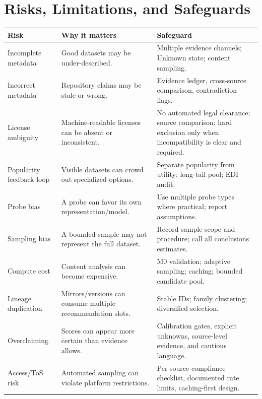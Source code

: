 \documentclass[11pt]{article}
\begin{document}
\section{Risks, Limitations, and Safeguards}
\begin{longtable}{@{}L{2.6cm}L{4.8cm}L{6.2cm}@{}}
\toprule
\textbf{Risk} & \textbf{Why it matters} & \textbf{Safeguard} \\
\midrule
\endhead
Incomplete metadata & Good datasets may be under-described. & Multiple evidence channels; Unknown state;
  content sampling. \\
Incorrect metadata & Repository claims may be stale or wrong. & Evidence ledger, cross-source comparison,
  contradiction flags. \\
License ambiguity & Machine-readable licenses can be absent or inconsistent. & No automated legal
  clearance; source comparison; hard exclusion only when incompatibility is clear and required. \\
Popularity feedback loop & Visible datasets can crowd out specialized options. & Separate popularity from
  utility; long-tail pool; EDI audit. \\
Probe bias & A probe can favor its own representation/model. & Use multiple probe types where practical;
  report assumptions. \\
Sampling bias & A bounded sample may not represent the full dataset. & Record sample scope and procedure;
  call all conclusions estimates. \\
Compute cost & Content analysis can become expensive. & M0 validation; adaptive sampling; caching; bounded
  candidate pool. \\
Lineage duplication & Mirrors/versions can consume multiple recommendation slots. & Stable IDs; family
  clustering; diversified selection. \\
Overclaiming & Scores can appear more certain than evidence allows. & Calibration gates, explicit unknowns,
  source-level evidence, and cautious language. \\
Access/ToS risk & Automated sampling can violate platform restrictions. & Per-source compliance checklist,
  documented rate limits, caching-first design. \\
\bottomrule
\end{longtable}

\end{document}
